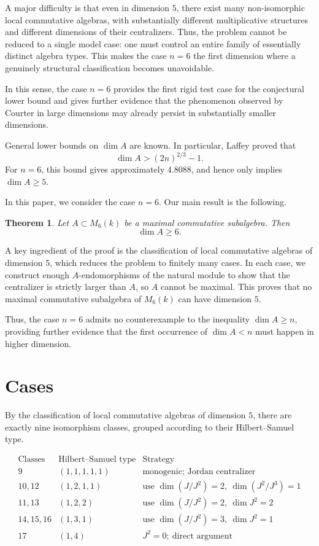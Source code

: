 \documentclass[11pt]{article}
\theoremstyle{plain}
\newtheorem{theorem}{Theorem}
\theoremstyle{remark}
\begin{document}
A major difficulty is that even in dimension $5$, there exist many non-isomorphic local commutative algebras, with substantially different multiplicative structures and different dimensions of their centralizers. Thus, the problem cannot be reduced to a single model case: one must control an entire family of essentially distinct algebra types. This makes the case $n=6$ the first dimension where a genuinely structural classification becomes unavoidable.


In this sense, the case $n=6$ provides the first rigid test case for the conjectural lower bound and gives further evidence that the phenomenon observed by Courter in large dimensions may already persist in substantially smaller dimensions.


General lower bounds on $\dim A$ are known. In particular, Laffey proved that
\[
\dim A > (2n)^{2/3} - 1.
\]
For $n = 6$, this bound gives approximately $4.8088$, and hence only implies $\dim A \geq 5$.

In this paper, we consider the case $n = 6$. Our main result is the following.

\begin{theorem}
	Let $A \subset M_6(k)$ be a maximal commutative subalgebra. Then
	\[
	\dim A \geq 6.
	\]
\end{theorem}

A key ingredient of the proof is the classification of local commutative algebras of dimension $5$, which reduces the problem to finitely many cases. In each case, we construct enough $A$-endomorphisms of the natural module to show that the centralizer is strictly larger than $A$, so $A$ cannot be maximal. This proves that no maximal commutative subalgebra of $M_6(k)$ can have dimension $5$.

Thus, the case $n=6$ admits no counterexample to the inequality $\dim A \geq n$, providing further evidence that the first occurrence of $\dim A < n$ must happen in higher dimension.







\section{Cases}

By the classification of local commutative algebras of dimension $5$, there are exactly nine isomorphism classes, grouped according to their Hilbert--Samuel type.

\[
\begin{array}{c|c|l}
	\text{Classes} & \text{Hilbert--Samuel type} & \text{Strategy} \\ \hline
	9 & (1,1,1,1,1) & \text{monogenic; Jordan centralizer} \\
	10,12 & (1,2,1,1) & \text{use } \dim(J/J^2)=2,\ \dim(J^2/J^3)=1 \\
	11,13 & (1,2,2) & \text{use } \dim(J/J^2)=2,\ \dim J^2=2 \\
	14,15,16 & (1,3,1) & \text{use } \dim(J/J^2)=3,\ \dim J^2=1 \\
	17 & (1,4) & J^2=0;\ \text{direct argument}
\end{array}
\]
\end{document}
